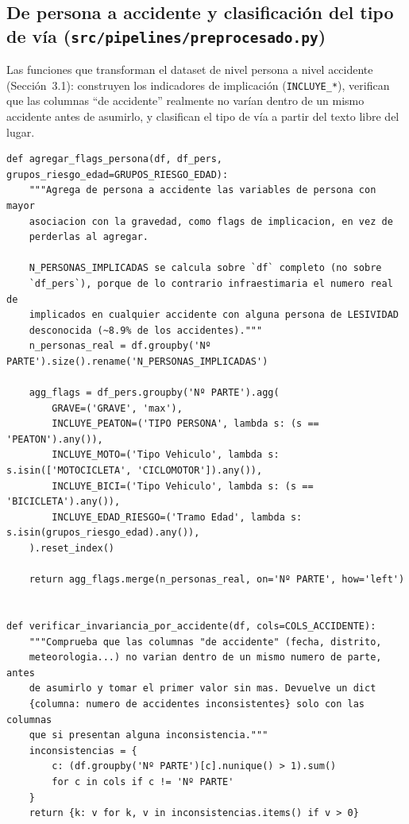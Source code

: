 \documentclass[11pt,a4paper]{article}
\begin{document}
\subsection{De persona a accidente y clasificación del tipo de vía (\texttt{src/pipelines/preprocesado.py})}
\label{app:preprocesado}

Las funciones que transforman el dataset de nivel persona a nivel accidente (Sección~3.1): construyen los indicadores de implicación (\texttt{INCLUYE\_*}), verifican que las columnas ``de accidente'' realmente no varían dentro de un mismo accidente antes de asumirlo, y clasifican el tipo de vía a partir del texto libre del lugar.

\begin{lstlisting}[caption={Agregación de persona a accidente, verificación de invariancia y clasificación del tipo de vía por texto.}]
def agregar_flags_persona(df, df_pers, grupos_riesgo_edad=GRUPOS_RIESGO_EDAD):
    """Agrega de persona a accidente las variables de persona con mayor
    asociacion con la gravedad, como flags de implicacion, en vez de
    perderlas al agregar.

    N_PERSONAS_IMPLICADAS se calcula sobre `df` completo (no sobre
    `df_pers`), porque de lo contrario infraestimaria el numero real de
    implicados en cualquier accidente con alguna persona de LESIVIDAD
    desconocida (~8.9% de los accidentes)."""
    n_personas_real = df.groupby('Nº PARTE').size().rename('N_PERSONAS_IMPLICADAS')

    agg_flags = df_pers.groupby('Nº PARTE').agg(
        GRAVE=('GRAVE', 'max'),
        INCLUYE_PEATON=('TIPO PERSONA', lambda s: (s == 'PEATON').any()),
        INCLUYE_MOTO=('Tipo Vehiculo', lambda s: s.isin(['MOTOCICLETA', 'CICLOMOTOR']).any()),
        INCLUYE_BICI=('Tipo Vehiculo', lambda s: (s == 'BICICLETA').any()),
        INCLUYE_EDAD_RIESGO=('Tramo Edad', lambda s: s.isin(grupos_riesgo_edad).any()),
    ).reset_index()

    return agg_flags.merge(n_personas_real, on='Nº PARTE', how='left')


def verificar_invariancia_por_accidente(df, cols=COLS_ACCIDENTE):
    """Comprueba que las columnas "de accidente" (fecha, distrito,
    meteorologia...) no varian dentro de un mismo numero de parte, antes
    de asumirlo y tomar el primer valor sin mas. Devuelve un dict
    {columna: numero de accidentes inconsistentes} solo con las columnas
    que si presentan alguna inconsistencia."""
    inconsistencias = {
        c: (df.groupby('Nº PARTE')[c].nunique() > 1).sum()
        for c in cols if c != 'Nº PARTE'
    }
    return {k: v for k, v in inconsistencias.items() if v > 0}



\end{lstlisting}
\end{document}
